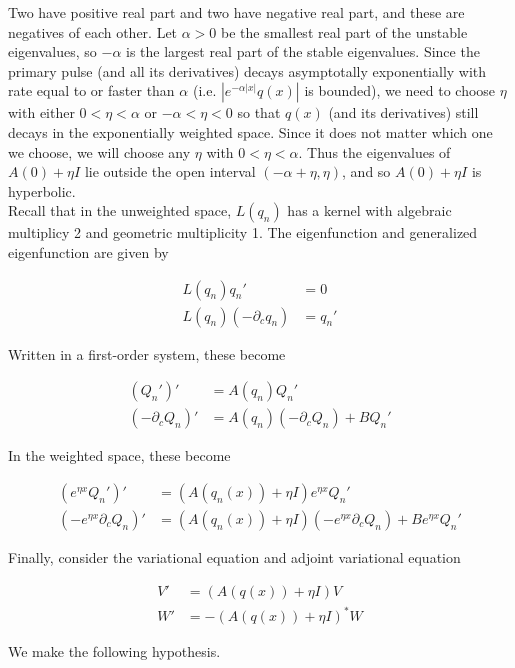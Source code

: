 \documentclass[12pt]{article}
\begin{document}
Two have positive real part and two have negative real part, and these are negatives of each other. Let $\alpha > 0$ be the smallest real part of the unstable eigenvalues, so $-\alpha$ is the largest real part of the stable eigenvalues. Since the primary pulse (and all its derivatives) decays asymptotally exponentially with rate equal to or faster than $\alpha$ (i.e. $|e^{-\alpha |x|} q(x)|$ is bounded), we need to choose $\eta$ with either $0 < \eta < \alpha$ or $-\alpha < \eta < 0$ so that $q(x)$ (and its derivatives) still decays in the exponentially weighted space. Since it does not matter which one we choose, we will choose any $\eta$ with $0 < \eta < \alpha$. Thus the eigenvalues of $A(0) + \eta I$ lie outside the open interval $(-\alpha + \eta, \eta)$, and so $A(0) + \eta I$ is hyperbolic.\\

Recall that in the unweighted space, $L(q_n)$ has a kernel with algebraic multiplicy 2 and geometric multiplicity 1. The eigenfunction and generalized eigenfunction are given by

\begin{align*}
L(q_n) q_n' &= 0 \\
L(q_n) (-\partial_c q_n) &= q_n'
\end{align*}

Written in a first-order system, these become

\begin{align*}
(Q_n')' &= A(q_n) Q_n' \\
(-\partial_c Q_n)' &= A(q_n) (-\partial_c Q_n) + B Q_n'
\end{align*}

In the weighted space, these become

\begin{align*}
(e^{\eta x} Q_n')' &= (A(q_n(x)) + \eta I) e^{\eta x}  Q_n' \\
(-e^{\eta x} \partial_c Q_n)' &= (A(q_n(x)) + \eta I) (-e^{\eta x} \partial_c Q_n) + B e^{\eta x} Q_n'
\end{align*}

Finally, consider the variational equation and adjoint variational equation

\begin{align}
V' &= (A(q(x)) + \eta I)V \label{vareq} \\
W' &= -(A(q(x)) + \eta I)^* W \label{adjvareq}
\end{align}

We make the following hypothesis.
\end{document}
